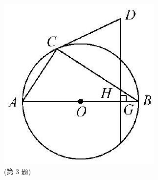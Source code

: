 \documentclass[10pt]{article}
\begin{document}
\includegraphics[max width=\textwidth, center]{2024_10_30_66b8e5e701da2093c133g-041}\\
(第 3 题)
\end{document}
